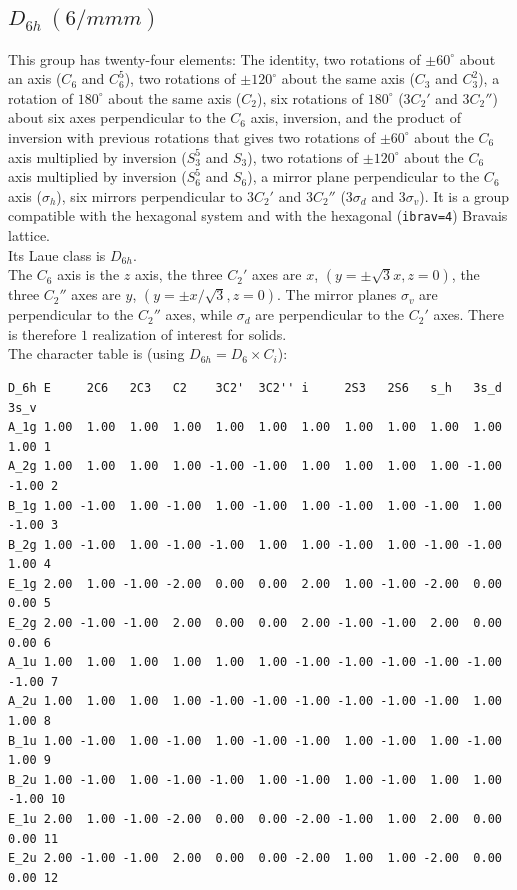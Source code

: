 \documentclass[12pt,a4paper]{article}
\begin{document}
\subsection{\color{web-blue}$D_{6h}\ (6/mmm)$} 
This group has twenty-four elements: The identity, two rotations of 
$\pm60^\circ$ about an axis ($C_6$ and $C_6^5$), two rotations of 
$\pm120^\circ$ about the same axis ($C_3$ and $C_3^2$), a rotation of 
$180^\circ$ about the same axis ($C_2$), six rotations of $180^\circ$ 
($3C_2'$ and $3C_2''$) about six axes perpendicular to the $C_6$ axis,
inversion, and the product of inversion with previous rotations that gives
two rotations of $\pm60^\circ$ about the
$C_6$ axis multiplied by inversion ($S_3^5$ and $S_3$), two rotations of 
$\pm120^\circ$ about the $C_6$ axis multiplied by inversion 
($S_6^5$ and $S_6$), a mirror plane 
perpendicular to the $C_6$ axis ($\sigma_h$), six mirrors perpendicular 
to $3C_2'$ and $3C_2''$ ($3\sigma_d$ and $3\sigma_v$).
It is a group compatible with the hexagonal system
and with the hexagonal (\texttt{ibrav=4}) Bravais lattice. \\
Its Laue class is $D_{6h}$. \\
The $C_6$ axis is the $z$ axis, the three $C_2'$ axes are 
$x$, $(y=\pm\sqrt{3}x, z=0)$, the three $C_2''$ axes
are $y$, $(y=\pm x/\sqrt{3}, z=0)$. The mirror planes
$\sigma_v$ are perpendicular to the $C_2''$ axes, while $\sigma_d$ are
perpendicular to the $C_2'$ axes. There is therefore $1$ realization
of interest for solids. \\
The character table is (using $D_{6h}=D_6 \times C_i$):
\begin{verbatim}
D_6h E     2C6   2C3   C2    3C2'  3C2'' i     2S3   2S6   s_h   3s_d  3s_v 
A_1g 1.00  1.00  1.00  1.00  1.00  1.00  1.00  1.00  1.00  1.00  1.00  1.00 1
A_2g 1.00  1.00  1.00  1.00 -1.00 -1.00  1.00  1.00  1.00  1.00 -1.00 -1.00 2
B_1g 1.00 -1.00  1.00 -1.00  1.00 -1.00  1.00 -1.00  1.00 -1.00  1.00 -1.00 3
B_2g 1.00 -1.00  1.00 -1.00 -1.00  1.00  1.00 -1.00  1.00 -1.00 -1.00  1.00 4
E_1g 2.00  1.00 -1.00 -2.00  0.00  0.00  2.00  1.00 -1.00 -2.00  0.00  0.00 5
E_2g 2.00 -1.00 -1.00  2.00  0.00  0.00  2.00 -1.00 -1.00  2.00  0.00  0.00 6
A_1u 1.00  1.00  1.00  1.00  1.00  1.00 -1.00 -1.00 -1.00 -1.00 -1.00 -1.00 7
A_2u 1.00  1.00  1.00  1.00 -1.00 -1.00 -1.00 -1.00 -1.00 -1.00  1.00  1.00 8
B_1u 1.00 -1.00  1.00 -1.00  1.00 -1.00 -1.00  1.00 -1.00  1.00 -1.00  1.00 9
B_2u 1.00 -1.00  1.00 -1.00 -1.00  1.00 -1.00  1.00 -1.00  1.00  1.00 -1.00 10
E_1u 2.00  1.00 -1.00 -2.00  0.00  0.00 -2.00 -1.00  1.00  2.00  0.00  0.00 11
E_2u 2.00 -1.00 -1.00  2.00  0.00  0.00 -2.00  1.00  1.00 -2.00  0.00  0.00 12
\end{verbatim}
\end{document}
